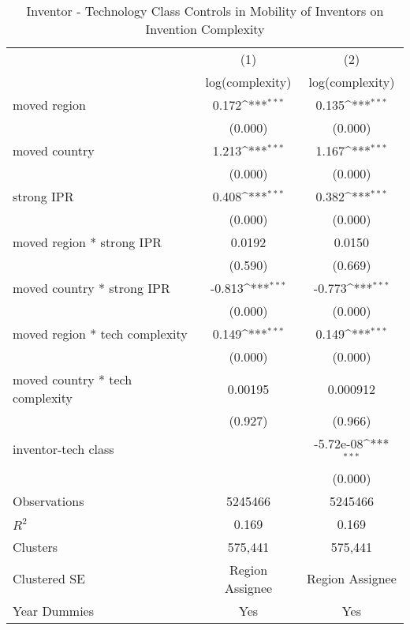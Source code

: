 {
\def\sym#1{\ifmmode^{#1}\else\(^{#1}\)\fi}
\begin{longtable}{l*{2}{c}}
\caption{Inventor - Technology Class Controls in Mobility of Inventors on Invention Complexity \label{model6a6b6c}}\\
\hline\hline\endfirsthead\hline\endhead\hline\endfoot\endlastfoot
                &\multicolumn{1}{c}{(1)}&\multicolumn{1}{c}{(2)}\\
                &\multicolumn{1}{c}{log(complexity)}&\multicolumn{1}{c}{log(complexity)}\\
\hline
moved region    &    0.172\sym{***}&    0.135\sym{***}\\
                &  (0.000)         &  (0.000)         \\
moved country   &    1.213\sym{***}&    1.167\sym{***}\\
                &  (0.000)         &  (0.000)         \\
strong IPR      &    0.408\sym{***}&    0.382\sym{***}\\
                &  (0.000)         &  (0.000)         \\
moved region * strong IPR&   0.0192         &   0.0150         \\
                &  (0.590)         &  (0.669)         \\
moved country * strong IPR&   -0.813\sym{***}&   -0.773\sym{***}\\
                &  (0.000)         &  (0.000)         \\
moved region * tech complexity&    0.149\sym{***}&    0.149\sym{***}\\
                &  (0.000)         &  (0.000)         \\
moved country * tech complexity&  0.00195         & 0.000912         \\
                &  (0.927)         &  (0.966)         \\
inventor-tech class&                  &-5.72e-08\sym{***}\\
                &                  &  (0.000)         \\
\hline
Observations    &  5245466         &  5245466         \\
$R^2$              &    0.169         &    0.169         \\
Clusters         &  575,441         &  575,441         \\
Clustered SE       &Region Assignee         &Region Assignee         \\
Year Dummies            &      Yes         &      Yes         \\

\end{longtable}}
